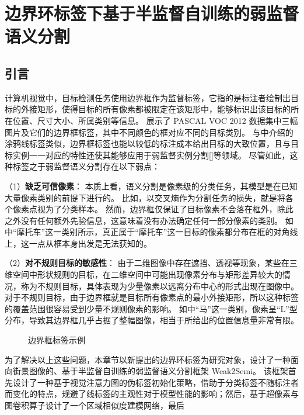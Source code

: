 \chapter{边界环标签下基于半监督自训练的弱监督语义分割}
\section{引言}
\label{sec:boundingring-intro}
计算机视觉中，目标检测任务使用边界框作为监督标签，它指的是标注者绘制出目标的外接矩形，使得目标的所有像素都被限定在该矩形中，能够标识出该目标的所在位置、尺寸大小、所属类别等信息。
展示了 PASCAL VOC 2012 数据集中三幅图片及它们的边界框标签，其中不同颜色的框对应不同的目标类别。
与中介绍的涂鸦线标签类似，边界框标签也能以较低的标注成本给出目标的大致位置，且与目标实例一一对应的特性还使其能够应用于弱监督实例分割[]等领域。
尽管如此，这种标签之于弱监督语义分割存在以下弱点：
\par
（1）\textbf{缺乏可信像素}：
本质上看，语义分割是像素级的分类任务，其模型是在已知大量像素类别的前提下进行的。
比如，以交叉熵作为分割任务的损失，就是将各个像素点视为了分类样本。
然而，边界框仅保证了目标像素不会落在框外，除此之外没有任何额外先验信息，这意味着没有办法确定任何一部分像素的类别。
如中“摩托车”这一类别所示，真正属于“摩托车”这一目标的像素都分布在框的对角线上，这一点从框本身出发是无法获知的。
\par
（2）\textbf{对不规则目标的敏感性}：
由于二维图像中存在遮挡、透视等现象，某些在三维空间中形状规则的目标，在二维空间中可能出现像素分布与矩形差异较大的情况，称为不规则目标，具体表现为少量像素以远离分布中心的形式出现在图像中。
对于不规则目标，由于边界框就是目标所有像素点的最小外接矩形，所以这种标签的覆盖范围很容易受到少量不规则像素的影响。
如中“马”这一类别，像素呈“L”型分布，导致其边界框几乎占据了整幅图像，相当于所给出的位置信息量非常有限。
\begin{figure}[h]
\centering
{}
\hfil
{}
\hfil
{}
\caption{边界框标签示例}
\label{fig:boundingbox-samples}
\end{figure}
\par
为了解决以上这些问题，本章节以新提出的边界环标签为研究对象，设计了一种面向街景图像的、基于半监督自训练的弱监督语义分割框架 Weak2Semi。
该框架首先设计了一种基于视觉注意力图的伪标签初始化策略，借助于分类标签不随标注者而变化的特点，规避了线标签的主观性对于模型性能的影响；然后，基于超像素与图卷积算子设计了一个区域相似度建模网络，最后
